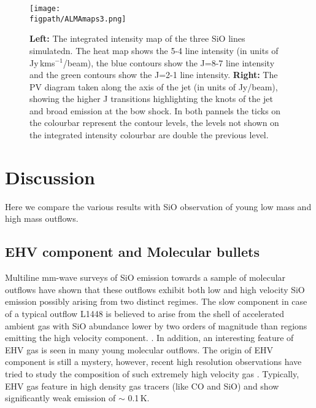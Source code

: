 \documentclass[useAMS,usenatbib,letters]{mn2e}
\newcommand{\figpath}{PFIGS/}
\begin{document}
\begin{figure*}
 \texttt{[image: \\figpath/ALMAmaps3.png]}
 \caption{{\bf Left:} The integrated intensity map of the three SiO lines simulatedn. The heat map shows the 5-4 line intensity (in units of Jy$\,$kms$^{-1}$/beam), the blue contours show the J=8-7 line intensity and the green contours show the J=2-1 line intensity. {\bf Right:} The PV diagram taken along the axis of the jet (in units of Jy/beam), showing the higher J transitions highlighting the knots of the jet and broad emission at the bow shock. In both pannels the ticks on the colourbar represent the contour levels, the levels not shown on the integrated intensity colourbar are double the previous level.}
\label{fig:almafig}
\end{figure*} 

\section{Discussion}
Here we compare the various results with SiO observation of young low
mass and high mass outflows.

\subsection{EHV component and Molecular bullets}
\label{ssec:EHV}
Multiline mm-wave surveys of SiO emission towards a sample of molecular
outflows have shown that these outflows exhibit both low and high
velocity SiO emission possibly arising from two distinct regimes. The slow
component in case of a typical outflow L1448 is believed to arise from
the shell of accelerated ambient gas with SiO abundance
lower by two orders of magnitude than regions emitting the high velocity component.
\cite{Codella:1999p12584}. In addition, an interesting feature of EHV
gas is seen in many young molecular outflows. The origin of EHV
component is still a mystery, however, recent high resolution
observations have tried to study the composition of such extremely high
velocity gas \cite{Tafalla:2010p14759}. Typically, EHV gas feature in
high density gas tracers (like CO and SiO) 
and show significantly weak emission of $\sim$ 0.1\,K.
%
\end{document}

